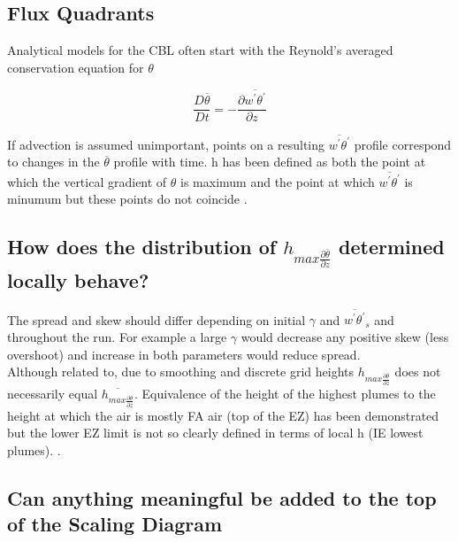 \subsection{Flux Quadrants}








Analytical models for the CBL often start with the Reynold's averaged conservation equation for $\theta$ \cite{Deardorff79}

\begin{equation}
\frac{D \overline{\theta}}{Dt} = -\frac{\partial \overline{w^{'} \theta^{'}}}{\partial z}
\end{equation}

If advection is assumed unimportant, points on a resulting $\overline{w^{'} \theta^{'}}$ profile correspond to changes in the $\overline{\theta}$ profile with time.  h has been defined as both the point at which the vertical gradient of $\theta$ is maximum and the point at which $\overline{w^{'} \theta^{'}}$ is minumum but these points do not coincide \cite{SullMoengStev}.

\subsection{How does the distribution of $h_{max \frac{\partial \overline{\theta}}{\partial z}}$ determined locally behave?}
The spread and skew should differ depending on initial $\gamma$ and $\overline{w^{'}\theta^{'}}_{s}$ 
and throughout the run.  For example a large $\gamma$ would decrease any positive skew (less overshoot) 
and increase in both parameters would reduce spread.\\

Although related to, due to smoothing and discrete grid heights $h_{max \frac{\partial \overline{\theta}}{\partial z}}$ does not necessarily equal 
$\overline{h_{max \frac{\partial {\theta}}{\partial z}}}$. Equivalence of the height of the highest plumes to the height at which the air is mostly FA air (top of the EZ) has been demonstrated but the lower EZ limit is not so clearly defined in terms of local h (IE lowest plumes).%
\cite{BrooksFowler2}. 

\subsection{Can anything meaningful be added to the top of the Scaling Diagram}

